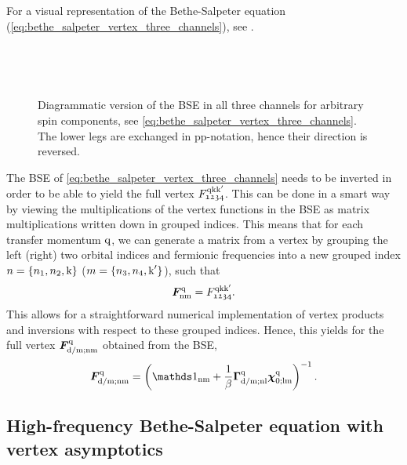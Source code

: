 \documentclass[../../main.tex]{subfiles}
\begin{document}
For a visual representation of the Bethe-Salpeter equation (\ref{eq:bethe_salpeter_vertex_three_channels}), see .
\begin{figure}[ht!]
  \centering
  \parbox{\textwidth}{
    \subfloat{}
  }\\[1cm]
  \parbox{\textwidth}{
    \subfloat{}
  }\\[1cm]
  \parbox{\textwidth}{
    \subfloat{}
  }
  \caption{Diagrammatic version of the BSE in all three channels for arbitrary spin components, see \eqref{eq:bethe_salpeter_vertex_three_channels}. The lower legs are exchanged in pp-notation, hence their direction is reversed.}
  \label{fig:bethe_salpeter_diagrammatic}
\end{figure}
The BSE of \eqref{eq:bethe_salpeter_vertex_three_channels} needs to be inverted in order to be able to yield the full vertex $F_{\mathfrak{1234}}^{\text{q}\text{k}\text{k}'}$. This can be done in a smart way by viewing the multiplications of the vertex functions in the BSE as matrix multiplications written down in grouped indices. This means that for each transfer momentum $\text{q}$, we can generate a matrix from a vertex by grouping the left (right) two orbital indices and fermionic frequencies into a new grouped index $n=\{n_1, n_2, \text{k}\}$ ($m=\{n_3, n_4, \text{k}'\}$), such that \cite{ab initio dyn} 
\begin{align}
	\bm{F}^{\text{q}}_{\text{nm}}=F^{\text{q}\text{k}\text{k}'}_{\mathfrak{1234}}.
\end{align}
This allows for a straightforward numerical implementation of vertex products and inversions with respect to these grouped indices. Hence, this yields for the full vertex $\bm{F}^{\text{q}}_{\text{d}/\text{m};\text{nm}}$ obtained from the BSE,
\begin{align}
	\bm{F}^{\q}_{\dens/\magn;\text{nm}}=\left (\unity_{\text{nm}} +\frac1\beta \bm{\Gamma}^{\q}_{\dens/\magn;\text{nl}}\bm{\chi}^{\q}_{0;\text{lm}}\right )^{-1}.
\end{align}

\subsection{High-frequency Bethe-Salpeter equation with vertex asymptotics}
\end{document}
